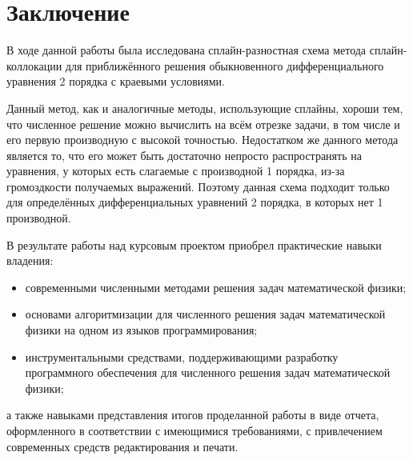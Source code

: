 \section{Заключение}

В ходе данной работы была исследована сплайн-разностная схема метода сплайн-коллокации для приближённого решения обыкновенного дифференциального уравнения 2 порядка с краевыми условиями.

Данный метод, как и аналогичные методы, использующие сплайны, хороши тем, что численное решение можно вычислить на всём отрезке задачи, в том числе и его первую производную с высокой точностью. Недостатком же данного метода является то, что его может быть достаточно непросто распространять на уравнения, у которых есть слагаемые с производной 1 порядка, из-за громоздкости получаемых выражений. Поэтому данная схема подходит только для определённых дифференциальных уравнений 2 порядка, в которых нет 1 производной.
 
В результате работы над курсовым проектом приобрел практические навыки владения:
\begin{itemize}
    \item современными численными методами решения задач математической физики;
    \item основами алгоритмизации для численного решения задач математической физики на одном из языков программирования;
    \item инструментальными средствами, поддерживающими разработку программного обеспечения для численного решения задач математической физики;
\end{itemize}
а также навыками представления итогов проделанной работы в виде отчета, оформленного в соответствии с имеющимися требованиями, с привлечением современных средств редактирования и печати.
